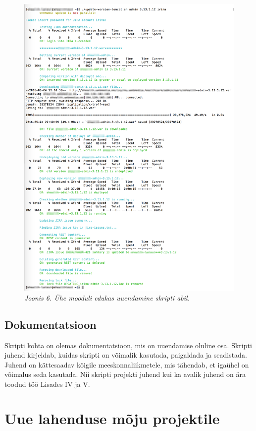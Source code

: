 \documentclass[12pt]{article}
\begin{document}
  \begin{figure}[H]
     \begin{center} 
       \includegraphics[width=.85\textwidth]{screenshots/one-module-successful-update.png}
       \caption*{\textit{Joonis 6. Ühe mooduli edukas uuendamine skripti abil.}}
     \end{center}
  \end{figure}
  
  \subsection{Dokumentatsioon}
  
  Skripti kohta on olemas dokumentatsioon, mis on uuendamise oluline osa. Skripti juhend kirjeldab, kuidas skripti on võimalik kasutada, paigaldada ja seadistada. Juhend on kättesaadav kõigile meeskonnaliikmetele, mis tähendab, et igaühel on võimalus seda kasutada. Nii skripti projekti juhend kui ka avalik juhend on ära toodud töö Lisades IV ja V.
  
  \newpage
  
  \section{Uue lahenduse mõju projektile}
  
\end{document}
